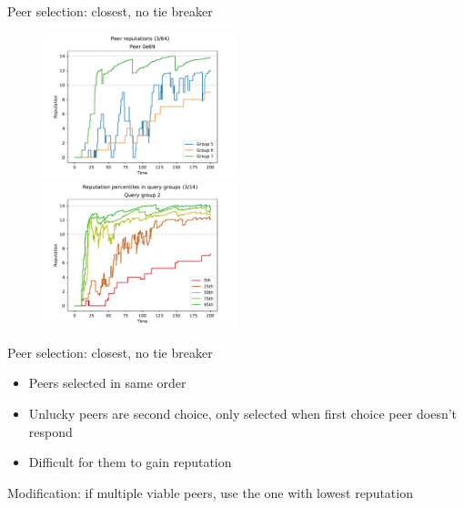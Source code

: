 \documentclass[presentation,english,usenames,dvipsnames]{beamer}
\begin{document}
\begin{frame}{Peer selection: closest, no tie breaker}
  \begin{figure}
    \centering
    \includegraphics[width=0.5\textwidth]{figures/selection_overlap_peer_reps_3_of_64}\pause%
    \includegraphics[width=0.5\textwidth]{figures/selection_overlap_rep_percs_3_of_14}
  \end{figure}
\end{frame}

\begin{frame}{Peer selection: closest, no tie breaker}
  \begin{itemize}
    \item Peers selected in same order
    \item Unlucky peers are second choice, only selected when first choice peer
          doesn't respond
    \item Difficult for them to gain reputation
  \end{itemize}

  \pause

  \begin{block}{}
    Modification: if multiple viable peers, use the one with lowest reputation
  \end{block}
\end{frame}
\end{document}
